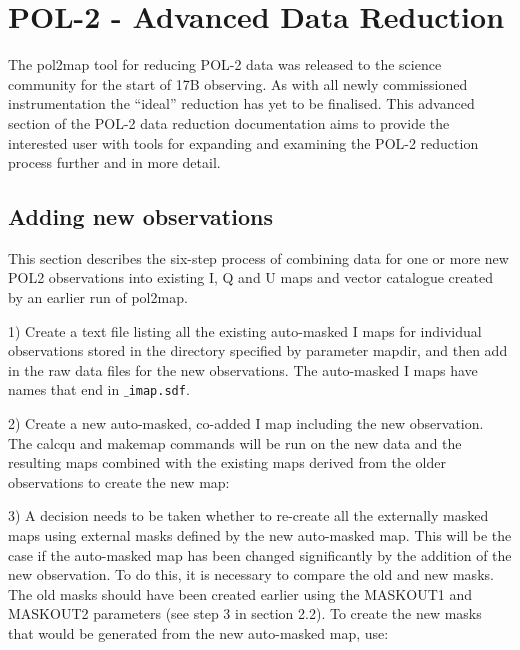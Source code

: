 \chapter{POL-2 - Advanced Data Reduction}
\label{sec:advanced}


The pol2map tool for reducing POL-2 data was released to the science
community for the start of 17B observing. As with all newly commissioned
instrumentation the ``ideal'' reduction has yet to be finalised. This advanced
section of the POL-2 data reduction documentation aims to provide the interested
user with tools for expanding and examining the POL-2 reduction process further and
in more detail.


\section{Adding new observations}

This section describes the six-step process of combining
data for one or more new POL2 observations into existing I,
Q and U maps and vector catalogue created by an earlier run of pol2map.

1) Create a text file listing all the existing auto-masked I maps for individual observations
stored in the directory specified by parameter mapdir, and then add in the raw data files
for the new observations. The auto-masked I maps have names that end in \texttt{$\_$imap.sdf}.

\begin{terminalv}
\end{terminalv}


2) Create a new auto-masked, co-added I map including the new observation. The
calcqu  and makemap
commands will be run on the new data and the resulting maps combined
with the existing maps derived from the older observations to create the new map:

\begin{terminalv}
\end{terminalv}


3) A decision needs to be taken whether to re-create all the externally masked maps using
external masks defined by the new auto-masked map. This will be the case if the auto-masked
map has been changed significantly by the addition of the new observation. To do this, it is
necessary to compare the old and new masks. The old masks should have been created
earlier using the MASKOUT1 and MASKOUT2 parameters (see step 3 in section 2.2). To
 create the new masks that would be generated from the new auto-masked map, use:

